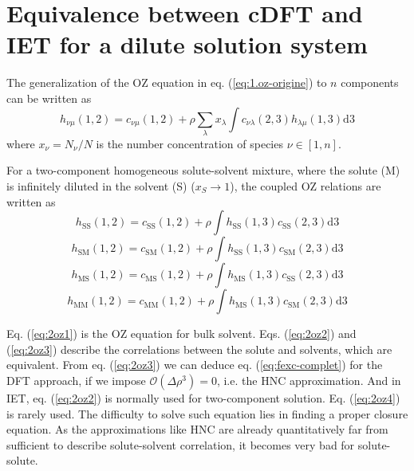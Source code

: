 \section{Equivalence between cDFT and IET for a dilute solution system\label{sec:Equivalence-iet-mdft}}

The generalization of the \acs{OZ} equation in eq. (\ref{eq:1.oz-origine})
to $n$ components can be written as
\begin{equation}
h_{\nu\mu}(1,2)=c_{\nu\mu}(1,2)+\rho\sum_{\lambda}x_{\lambda}\int c_{\nu\lambda}(2,3)h_{\lambda\mu}(1,3)\mathrm{d}3
\end{equation}
where $x_{\nu}=N_{\nu}/N$ is the number concentration of species
$\nu\in\left[1,n\right]$.

For a two-component homogeneous solute-solvent mixture, where the
solute (M) is infinitely diluted in the solvent (S) ($x_{S}\rightarrow1$),
the coupled \acs{OZ} relations are written as
\begin{equation}
h_{\mathrm{SS}}(1,2)=c_{\mathrm{SS}}(1,2)+\rho\int h_{\mathrm{SS}}(1,3)c_{\mathrm{SS}}(2,3)\mathrm{d}3\label{eq:2oz1}
\end{equation}
\begin{equation}
h_{\mathrm{SM}}(1,2)=c_{\mathrm{SM}}(1,2)+\rho\int h_{\mathrm{SS}}(1,3)c_{\mathrm{SM}}(2,3)\mathrm{d}3\label{eq:2oz2}
\end{equation}
\begin{equation}
h_{\mathrm{MS}}(1,2)=c_{\mathrm{MS}}(1,2)+\rho\int h_{\mathrm{MS}}(1,3)c_{\mathrm{SS}}(2,3)\mathrm{d}3\label{eq:2oz3}
\end{equation}
\begin{equation}
h_{\mathrm{MM}}(1,2)=c_{\mathrm{MM}}(1,2)+\rho\int h_{\mathrm{MS}}(1,3)c_{\mathrm{SM}}(2,3)\mathrm{d}3\label{eq:2oz4}
\end{equation}

Eq. (\ref{eq:2oz1}) is the \acs{OZ} equation for bulk solvent. Eqs.
(\ref{eq:2oz2}) and (\ref{eq:2oz3}) describe the correlations between
the solute and solvents, which are equivalent. From eq. (\ref{eq:2oz3})
we can deduce eq. (\ref{eq:fexc-complet}) for the \acs{DFT} approach,
if we impose $\mathcal{O}(\Delta\rho{}^{3})=0$, i.e. the \acs{HNC}
approximation. And in \acs{IET}, eq. (\ref{eq:2oz2}) is normally
used for two-component solution. Eq. (\ref{eq:2oz4}) is rarely used.
The difficulty to solve such equation lies in finding a proper closure
equation. As the approximations like \acs{HNC} are already quantitatively
far from sufficient to describe solute-solvent correlation, it becomes
very bad for solute-solute.
